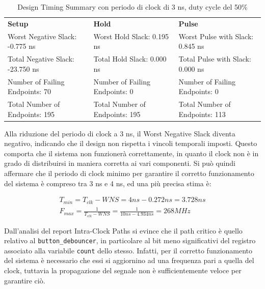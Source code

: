 \begin{table}[h!]
    \centering \scriptsize
    \begin{tabular}{p{4.8cm}p{4.8cm}p{4.8cm}}
        \hline
        \textbf{Setup} & \textbf{Hold} & \textbf{Pulse} \\
        Worst Negative Slack: \hfill -0.775 ns &
        Worst Hold Slack: \hfill 0.195 ns &
        Worst Pulse with Slack: \hfill 0.845 ns \\
        Total Negative Slack: \hfill -23.750 ns &
        Total Hold Slack: \hfill 0.000 ns &
        Total Pulse with Slack: \hfill 0.000 ns \\
        Number of Failing Endpoints: \hfill 70 &
        Number of Failing Endpoints: \hfill 0 &
        Number of Failing Endpoints: \hfill 0 \\
        Total Number of Endpoints: \hfill 195 &
        Total Number of Endpoints: \hfill 195 &
        Total Number of Endpoints: \hfill 113 \\
        \hline
    \end{tabular}
    \caption{Design Timing Summary con periodo di clock di 3 ns, duty cycle del 50\%}
    \label{tab:timing_analysis_3ns}
\end{table}

Alla riduzione del periodo di clock a 3 ns, il Worst Negative Slack diventa negativo, indicando che il design non rispetta i vincoli temporali imposti. Questo comporta che il sistema non funzionerà correttamente, in quanto il clock non è in grado di distribuirsi in maniera corretta ai vari componenti. Si può quindi affermare che il periodo di clock minimo per garantire il corretto funzionamento del sistema è compreso tra 3 ns e 4 ns, ed una più precisa stima è:

\begin{align*}
    T_{min} = T_{clk} - WNS = 4 ns - 0.272 ns = 3.728 ns \\
    F_{max} = \frac{1}{T_{clk} - WNS} = \frac{1}{10 ns - 4.934 ns} = 268 MHz
\end{align*}

Dall'analisi del report Intra-Clock Paths si evince che il path critico è quello relativo al \texttt{button\_debouncer}, in particolare al bit meno significativi del registro associato alla variabile \texttt{count} dello stesso. Infatti, per il corretto funzionamento del sistema è necessario che essi si aggiornino ad una frequenza pari a quella del clock, tuttavia la propagazione del segnale non è sufficientemente veloce per garantire ciò.